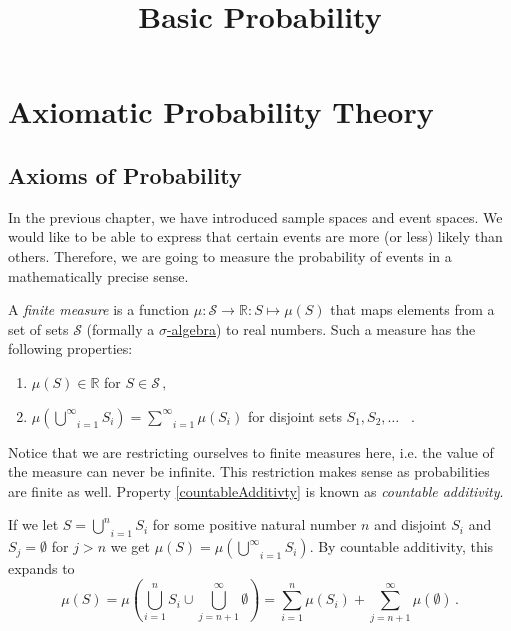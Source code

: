 \documentclass[a4paper,11pt,leqno]{report}
\title{Basic Probability}
\date{}
\begin{document}
\setcounter{chapter}{1}
\chapter{Axiomatic Probability Theory}

\section{Axioms of Probability}
In the previous chapter, we have introduced sample spaces and event spaces. We would like to be able
to express that certain events are more (or less) likely than others. 
Therefore, we are going to measure the probability of events in a mathematically precise sense. 

\begin{Definition}\label{axioms}
A \emph{finite measure} is a function $ \mu: \mathcal{S} \rightarrow \mathbb{R} : S \mapsto \mu (S) $ 
that maps elements
from a set of sets $ \mathcal{S} $ (formally a \href{http://en.wikipedia.org/wiki/Sigma-algebra}
{$ \sigma $-algebra}) to real numbers. Such a measure has the following properties:
\begin{enumerate}
\item $ \mu(S) \in \mathbb{R} $ for $ S \in \mathcal{S} \, ,$
\item $ \mu\left( \underset{i = 1}{\overset{\infty}{\bigcup}} S_{i} \right)
= \underset{i = 1}{\overset{\infty}{\sum}} \mu \left( S_{i} \right) $ for disjoint sets $S_1, S_2, \ldots$ \, . \label{countableAdditivty}
\end{enumerate}
\end{Definition}

Notice that we are restricting ourselves to finite measures here, i.e. the value of the measure can never
be infinite. This restriction makes sense as probabilities are finite as well. Property \ref{countableAdditivty} is 
known as \emph{countable additivity}. 

If we let 
$ S = \underset{i=1}{\overset{n}{\bigcup}} S_{i} $ for some positive natural number $ n $ and disjoint 
$ S_{i} $ and $ S_{j} = 
\emptyset $ for $ j > n $ we get $ \mu(S) = \mu(\underset{i=1}{\overset{\infty}{\bigcup}} S_{i}) $. By
countable additivity, this expands to
\begin{equation}
\mu(S) = \mu \left( \underset{i=1}{\overset{n}{\bigcup}} S_{i} \cup 
\underset{j=n+1}{\overset{\infty}{\bigcup}} \emptyset \right) 
= \underset{i=1}{\overset{n}{\sum}} \mu ( S_{i} )
+ \underset{j=n+1}{\overset{\infty}{\sum}} \mu ({\emptyset}) \, .
\end{equation}
\end{document}
